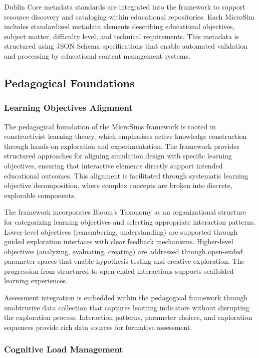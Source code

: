 Dublin Core metadata standards are integrated into the framework to support resource discovery and cataloging within educational repositories. Each MicroSim includes standardized metadata elements describing educational objectives, subject matter, difficulty level, and technical requirements. This metadata is structured using JSON Schema specifications that enable automated validation and processing by educational content management systems.

\subsection{Pedagogical Foundations}

\subsubsection{Learning Objectives Alignment}

The pedagogical foundation of the MicroSims framework is rooted in constructivist learning theory, which emphasizes active knowledge construction through hands-on exploration and experimentation. The framework provides structured approaches for aligning simulation design with specific learning objectives, ensuring that interactive elements directly support intended educational outcomes. This alignment is facilitated through systematic learning objective decomposition, where complex concepts are broken into discrete, explorable components.

The framework incorporates Bloom's Taxonomy as an organizational structure for categorizing learning objectives and selecting appropriate interaction patterns. Lower-level objectives (remembering, understanding) are supported through guided exploration interfaces with clear feedback mechanisms. Higher-level objectives (analyzing, evaluating, creating) are addressed through open-ended parameter spaces that enable hypothesis testing and creative exploration. The progression from structured to open-ended interactions supports scaffolded learning experiences.

Assessment integration is embedded within the pedagogical framework through unobtrusive data collection that captures learning indicators without disrupting the exploration process. Interaction patterns, parameter choices, and exploration sequences provide rich data sources for formative assessment.

\subsubsection{Cognitive Load Management}

